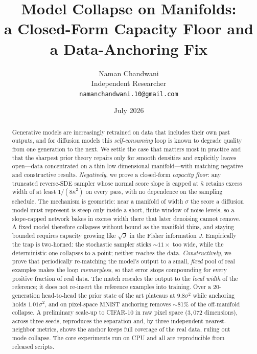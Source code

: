 \documentclass[11pt]{article}
\title{\bf Model Collapse on Manifolds:\\ a Closed-Form Capacity Floor and a Data-Anchoring Fix}
\author{Naman Chandwani\\ \small Independent Researcher\\ \small \texttt{namanchandwani.10@gmail.com}}
\date{July 2026}
\theoremstyle{remark}
\newcommand{\kb}{\bar\kappa}
\begin{document}
\maketitle

\begin{abstract}
Generative models are increasingly retrained on data that includes their own past outputs,
and for diffusion models this \emph{self-consuming} loop is known to degrade quality from
one generation to the next. We settle the case that matters most in practice and that the
sharpest prior theory \citep{khelifa2026recursive} repairs only for smooth densities and
explicitly leaves open---data concentrated on a thin low-dimensional manifold---with
matching negative and constructive results. \emph{Negatively}, we prove a closed-form
\emph{capacity floor}: any truncated reverse-SDE sampler whose normal score slope is capped
at $\kb$ retains excess width of at least $1/(8\kb^2)$ on every pass, with no dependence on
the sampling schedule. The mechanism is geometric: near a manifold of width $\sigma$ the
score a diffusion model must represent is steep only inside a short, finite window of noise
levels, so a slope-capped network bakes in excess width there that later denoising cannot
remove. A fixed model therefore collapses without bound as the manifold thins, and staying
bounded requires capacity growing like $\sqrt{J}$ in the Fisher information $J$. Empirically
the trap is two-horned: the
stochastic sampler sticks $\sim\!11\times$ too wide, while the deterministic one collapses to
a point; neither reaches the data. \emph{Constructively}, we prove that periodically
re-matching the model's output to a small, \emph{fixed} pool of real examples makes the loop
\emph{memoryless}, so that error stops compounding for every positive fraction of real data.
The match rescales the output to the \emph{local width} of the reference; it does not
re-insert the reference examples into training. Over a 20-generation head-to-head the
prior state of the art plateaus at $9.8\sigma^2$ while anchoring holds $1.01\sigma^2$, and
on pixel-space MNIST anchoring removes $\sim$81\% of the off-manifold collapse. A
preliminary scale-up to CIFAR-10 in raw pixel space ($3{,}072$ dimensions), across three
seeds, reproduces the separation and, by three independent nearest-neighbor metrics, shows
the anchor keeps full coverage of the real data, ruling out mode collapse. The core
experiments run on CPU and all are reproducible from released scripts.
\end{abstract}
\end{document}
